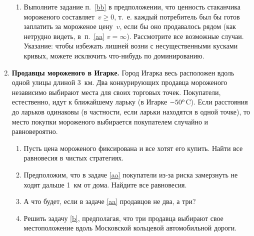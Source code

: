 \documentclass[a4paper,12pt]{article}
\begin{document}
\begin{enumerate}
\begin{enumerate}
\item Выполните задание п.~\ref{bb} в предположении, что
ценность стаканчика мороженого составляет~$v\ge 0$, т.~е.
каждый потребитель был бы готов заплатить за мороженое
цену~$v$, если бы оно продавалось рядом (как нетрудно
видеть, в~п.~\ref{aa} $v=\infty$). Рассмотрите все
возможные случаи. Указание: чтобы избежать лишней возни с
несущественными кусками кривых, можете исключить что-нибудь
по доминированию.

\end{enumerate}

\item {\bf Продавцы мороженого в Игарке.} Город Игарка весь
расположен вдоль одной улицы длиной 3~км. Два конкурирующих
продавца мороженого независимо выбирают места для своих
торговых точек. Покупатели, естественно, идут к ближайшему
ларьку (в Игарке $-50^{\rm o}$C). Если расстояния до
ларьков одинаковы (в частности, если ларьки находятся в
одной точке), то место покупки мороженого выбирается
покупателем случайно и равновероятно.

\begin{enumerate}

\item\label{aa} Пусть цена мороженого фиксирована и все
хотят его купить. Найти все равновесия в чистых стратегиях.

\item Предположим, что в задаче \ref{aa} покупатели из-за
риска замерзнуть не ходят дальше 1~км от дома. Найдите все
равновесия.

\item\label{b} А что будет, если в задаче \ref{aa}
продавцов не два, а три?

\item Решить задачу \ref{b}, предполагая, что три продавца
выбирают свое местоположение вдоль Московской кольцевой
автомобильной дороги.

\end{enumerate}


\end{enumerate}
\end{document}
